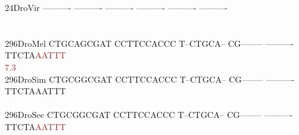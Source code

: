 \documentclass[11pt,twoside,reqno,a4paper]{article}
\begin{document}
{24\hspace*{2\charwidth}DroVir	----------	----------	----------	----------	----------	----------	\\
\hspace*{4\charwidth}\hspace*{7\charwidth}\hspace*{1\charwidth}\hspace*{1\charwidth}\hspace*{1\charwidth}\hspace*{1\charwidth}\hspace*{1\charwidth}\hspace*{1\charwidth}\\
\\
296\hspace*{1\charwidth}DroMel	CTGCAGCGAT	CCTTCCACCC	T--CTGCA--	CG--------	----------	TTCTA\textcolor{Brown}{A}\textcolor{Brown}{A}\textcolor{Brown}{T}\textcolor{Brown}{T}\textcolor{Brown}{T}	\\
\hspace*{4\charwidth}\hspace*{7\charwidth}\hspace*{1\charwidth}\hspace*{1\charwidth}\hspace*{1\charwidth}\hspace*{1\charwidth}\hspace*{1\charwidth}\hspace*{55\charwidth}\textcolor{Brown}{7.3}\hspace*{1\charwidth}\\
296\hspace*{1\charwidth}DroSim	CTGCGGCGAT	CCTTCCACCC	T--CTGCA--	CG--------	----------	TTCTAAATTT	\\
\hspace*{4\charwidth}\hspace*{7\charwidth}\hspace*{1\charwidth}\hspace*{1\charwidth}\hspace*{1\charwidth}\hspace*{1\charwidth}\hspace*{1\charwidth}\hspace*{1\charwidth}\\
296\hspace*{1\charwidth}DroSec	CTGCGGCGAT	CCTTCCACCC	T--CTGCA--	CG--------	----------	TTCTA\textcolor{Brown}{A}\textcolor{Brown}{A}\textcolor{Brown}{T}\textcolor{Brown}{T}\textcolor{Brown}{T}	\\
}
\end{document}
